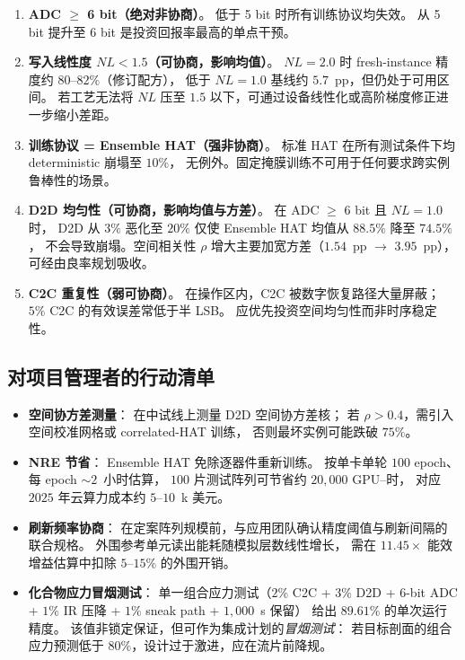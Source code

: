 \begin{enumerate}
    \item \textbf{ADC $\ge$ 6 bit（绝对非协商）}。
    低于 5 bit 时所有训练协议均失效。
    从 5 bit 提升至 6 bit 是投资回报率最高的单点干预。
    
    \item \textbf{写入线性度 $NL < 1.5$（可协商，影响均值）}。
    $NL=2.0$ 时 fresh-instance 精度约 $80$--$82\%$（修订配方），
    低于 $NL=1.0$ 基线约 $5.7$~pp，但仍处于可用区间。
    若工艺无法将 $NL$ 压至 $1.5$ 以下，可通过设备线性化或高阶梯度修正进一步缩小差距。
    
    \item \textbf{训练协议 = Ensemble HAT（强非协商）}。
    标准 HAT 在所有测试条件下均 deterministic 崩塌至 $10\%$，
    无例外。固定掩膜训练不可用于任何要求跨实例鲁棒性的场景。
    
    \item \textbf{D2D 均匀性（可协商，影响均值与方差）}。
    在 ADC $\ge$ 6 bit 且 $NL=1.0$ 时，
    D2D 从 $3\%$ 恶化至 $20\%$ 仅使 Ensemble HAT 均值从 $88.5\%$ 降至 $74.5\%$，
    不会导致崩塌。空间相关性 $\rho$ 增大主要加宽方差（$1.54$~pp $\to$ $3.95$~pp），
    可经由良率规划吸收。
    
    \item \textbf{C2C 重复性（弱可协商）}。
    在操作区内，C2C 被数字恢复路径大量屏蔽；
    $5\%$ C2C 的有效误差常低于半 LSB。
    应优先投资空间均匀性而非时序稳定性。
\end{enumerate}

\subsection{对项目管理者的行动清单}

\begin{itemize}
    \item \textbf{空间协方差测量}：
    在中试线上测量 D2D 空间协方差核；
    若 $\rho > 0.4$，需引入空间校准网格或 correlated-HAT 训练，
    否则最坏实例可能跌破 $75\%$。
    
    \item \textbf{NRE 节省}：
    Ensemble HAT 免除逐器件重新训练。
    按单卡单轮 $100$ epoch、每 epoch $\sim$$2$~小时估算，
    $100$ 片测试阵列可节省约 $20{,}000$ GPU--时，
    对应 $2025$ 年云算力成本约 $5$--$10$~k 美元。
    
    \item \textbf{刷新频率协商}：
    在定案阵列规模前，与应用团队确认精度阈值与刷新间隔的联合规格。
    外围参考单元读出能耗随模拟层数线性增长，
    需在 $11.45\times$ 能效增益估算中扣除 $5$--$15\%$ 的外围开销。
    
    \item \textbf{化合物应力冒烟测试}：
    单一组合应力测试（$2\%$ C2C + $3\%$ D2D + 6-bit ADC + $1\%$ IR 压降 + $1\%$  sneak path + $1{,}000$~s 保留）
    给出 $89.61\%$ 的单次运行精度。
    该值非锁定保证，但可作为集成计划的\emph{冒烟测试}：
    若目标剖面的组合应力预测低于 $80\%$，设计过于激进，应在流片前降规。
\end{itemize}

